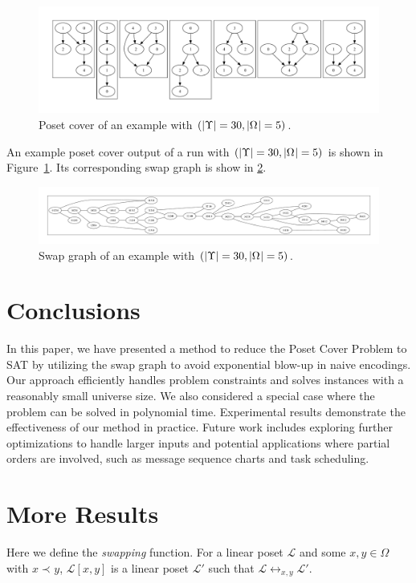 \documentclass[12pt]{llncs}
\DeclarePairedDelimiter{\abs}{\lvert}{\rvert}
\newcommand{\poset}[1]{\mathcal{#1}}
\newcommand{\uni}[1][]{\Omega_{#1}}
\newcommand{\swap}[1][]{\leftrightarrow_{#1}}
\newcommand{\covered}[1][]{\prec_{#1}}
\newcommand{\swapfn}[2]{#1[#2]}
\begin{document}
\begin{figure}[h]
    \centering
    \includegraphics[width=0.9\linewidth]{cover_example}
    \caption{Poset cover of an example with $(\abs{\Upsilon} = 30, \abs{\uni} = 5)$.}
    \label{figure:cover_exp}
\end{figure}

An example poset cover output of a run with $(\abs{\Upsilon} = 30, \abs{\uni} = 5)$ is shown in Figure~\ref{figure:cover_exp}. Its corresponding swap graph is show in \ref{figure:swap_exp}.

\begin{figure}[h]
    \centering
    \includegraphics[width=0.9\linewidth]{swap_graph_example}
    \caption{Swap graph of an example with $(\abs{\Upsilon} = 30, \abs{\uni} = 5)$.}
    \label{figure:swap_exp}
\end{figure}

\section{Conclusions}

In this paper, we have presented a method to reduce the Poset Cover Problem to SAT by utilizing the swap graph to avoid exponential blow-up in naive encodings. Our approach efficiently handles problem constraints and solves instances with a reasonably small universe size. We also considered a special case where the problem can be solved in polynomial time. Experimental results demonstrate the effectiveness of our method in practice. Future work includes exploring further optimizations to handle larger inputs and potential applications where partial orders are involved, such as message sequence charts and task scheduling.

\appendix
\renewcommand{\thesection}{\appendixname~\Alph{section}}
\section{More Results}
\label{appendix:connected-proof}
Here we define the \emph{swapping} function. For a linear poset $\poset{L}$ and some $x,y \!\in\! \uni$ with $x \covered y$, $\swapfn{\poset{L}}{x,y}$ is a linear poset $\poset{L}'$ such that $\poset{L} \swap[x,y] \poset{L}'$.
\end{document}
